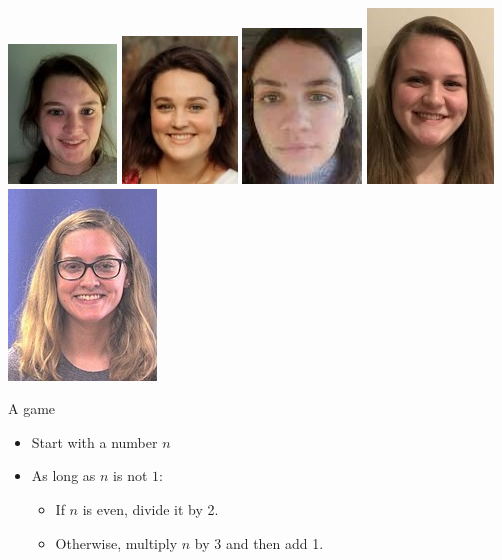 \documentclass[xcolor={usenames,dvipsnames,svgnames,table},12pt]{beamer}
\begin{document}
\begin{frame}{}
\begin{center}
\includegraphics[width=\photosize]{S21/000573238.jpg}
\includegraphics[width=\photosize]{S21/000572628.jpg}
\includegraphics[width=\photosize]{S21/000572775.jpg}
\includegraphics[width=\photosize]{S21/000573692.jpg}
\includegraphics[width=\photosize]{S21/000565336.jpg}
  \end{center}
\end{frame}

\begin{frame}{A game}
  \begin{itemize}
  \item Start with a number $n$
  \item As long as $n$ is not $1$:
    \begin{itemize}
    \item If $n$ is even, divide it by 2.
    \item Otherwise, multiply $n$ by 3 and then add 1.
    \end{itemize}
  \end{itemize}
\end{frame}
\end{document}
